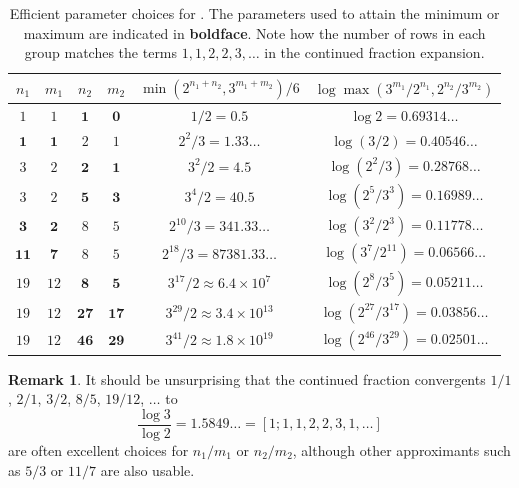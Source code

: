 \documentclass[12pt,a4paper,reqno]{amsart}
\numberwithin{equation}{section}
\theoremstyle{plain}
\theoremstyle{definition}
\newtheorem{remark}[theorem]{Remark}
\begin{document}
\begin{table}[ht]
\centering
\begin{tabular}{|c|c|c|c|c|c|}
\hline
\rule{0pt}{12pt}$n_1$ & $m_1$ & $n_2$ & $m_2$ & $\min(2^{n_1+n_2},3^{m_1+m_2})/6$ & $\log \max(3^{m_1}/2^{n_1}, 2^{n_2}/3^{m_2})$ \\[2pt]
\hline
\rule{0pt}{12pt}$1$ & $1$ & $\mathbf{1}$ & $\mathbf{0}$ & $1/2 = 0.5$ & $\log 2 = 0.69314\dots$ \\
\hline
\rule{0pt}{12pt}$\mathbf{1}$ & $\mathbf{1}$ & $2$ & $1$ & $2^2/3 = 1.33\dots$ & $\log (3/2) = 0.40546\dots$\\
\hline
\rule{0pt}{12pt}$3$ & $2$ & $\mathbf{2}$ & $\mathbf{1}$ & $3^2/2 = 4.5$ & $\log (2^2/3) = 0.28768\dots$ \\
$3$ & $2$ & $\mathbf{5}$ & $\mathbf{3}$ & $3^4/2 = 40.5$ & $\log (2^5/3^3) = 0.16989\dots$ \\
\hline
\rule{0pt}{12pt}$\mathbf{3}$ & $\mathbf{2}$ & $8$ & $5$ & $2^{10}/3 = 341.33\dots$ & $\log (3^2/2^3) = 0.11778\dots$\\ 
$\mathbf{11}$ & $\mathbf{7}$ & $8$ & $5$ & $2^{18}/3 = 87381.33\dots$ & $\log (3^7/2^{11}) = 0.06566\dots$ \\
\hline
\rule{0pt}{12pt}$19$ & $12$ & $\mathbf{8}$ & $\mathbf{5}$ & $3^{17}/2 \approx 6.4 \times 10^7$ & $\log (2^8/3^5) = 0.05211\dots$ \\
$19$ & $12$ & $\mathbf{27}$ & $\mathbf{17}$ & $3^{29}/2 \approx 3.4 \times 10^{13}$ & $\log (2^{27}/3^{17}) = 0.03856\dots$ \\
$19$ & $12$ & $\mathbf{46}$ & $\mathbf{29}$ & $3^{41}/2 \approx 1.8 \times 10^{19} $ & $\log (2^{46}/3^{29}) = 0.02501\dots$ \\
\hline
\end{tabular}
\bigskip

\caption{Efficient parameter choices for .  The parameters used to attain the minimum or maximum are indicated in \textbf{boldface}. Note how the number of rows in each group matches the terms $1,1,2,2,3,\dots$ in the continued fraction expansion.}\label{approx-table}
\end{table}

\begin{remark}
It should be unsurprising that the continued fraction convergents $1/1$, $2/1$, $3/2$, $8/5$, $19/12$, $\dots$ to 
$$\frac{\log 3}{\log 2} = 1.5849\dots = [1; 1,1,2,2,3,1,\dots]$$
are often excellent choices for $n_1/m_1$ or $n_2/m_2$, although other approximants such as $5/3$ or $11/7$ are also usable.
\end{remark}
\end{document}

